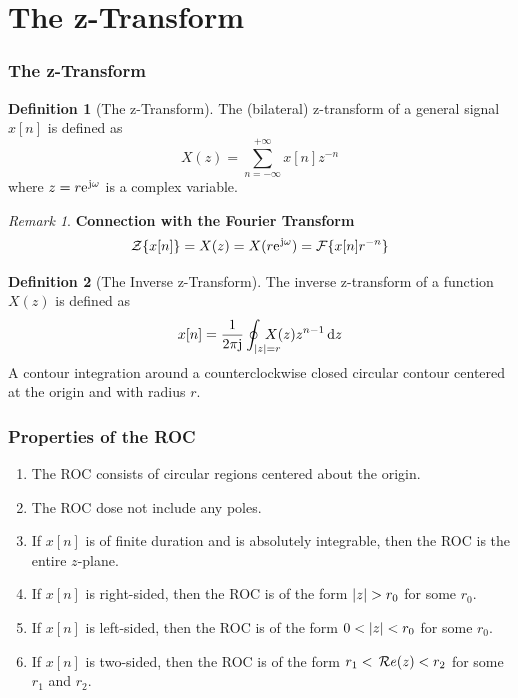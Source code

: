 \documentclass[10pt,UTF8]{article}
\newenvironment{definition box}
{\begin{tcolorbox}[colback=blue!5!white,colframe=blue!75!black,parbox=false,before upper=\par,before lower=\par]}
{\end{tcolorbox}}
\newenvironment{theorem box}
{\begin{tcolorbox}[colback=yellow!5!white,colframe=yellow!75!black,parbox=false,before upper=\par,before lower=\par]}
{\end{tcolorbox}}
\theoremstyle{definition}
\newtheorem{definition inner}{Definition}[section]
\newenvironment{definition}[1][]
{\begin{definition box}\begin{definition inner}[#1]\hfill\par}
{\end{definition inner}\end{definition box}}
\theoremstyle{plain}
\newtheorem{theorem inner}{Theorem}[section]
\theoremstyle{definition}
\newtheorem*{proof inner}{\textit{Proof}}
\theoremstyle{remark}
\newtheorem*{remark}{\textit{Remark}}
\newcommand{\ju}{\mathrm{j}}  %
\newcommand{\e}{\mathrm{e}{\mkern 1 mu}}
\renewcommand{\Re}{\,\mathcal{R}\ensuremath{e}\qty}
\begin{document}
\part*{The z-Transform}

\section{The z-Transform}

\begin{definition}[The z-Transform]
The (bilateral) z-transform of a general signal $x[n]$ is defined as
\begin{equation*}
    X(z) =
    \sum_{n=-\infty}^{+\infty} x[n] z^{-n}
\end{equation*}
where $z=r\e^{\ju\omega}$ is a complex variable.
\end{definition}

\begin{remark}
\textbf{Connection with the Fourier Transform}
\begin{equation*}
    \mathcal{Z}\{x[n]\} = X(z) =
    X(r\e^{\ju\omega}) = \mathcal{F}\{x[n] r^{-n}\}
\end{equation*}
\end{remark}

\begin{definition}[The Inverse z-Transform]
The inverse z-transform of a function $X(z)$ is defined as
\begin{equation*}
    x[n] = \frac{1}{2\pi\ju} \oint_{\abs{z}=r}\!\!\!\!\!\!\!\!
    X(z) z^{n-1} \dd{z}
\end{equation*}
A contour integration around a counterclockwise closed
circular contour centered at the origin and with radius $r$.
\end{definition}



\section{Properties of the ROC}

\begin{enumerate}
    \item The ROC consists of circular regions centered about the origin.
    \item The ROC dose not include any poles.
    \item If $x[n]$ is of finite duration and is absolutely integrable,
    then the ROC is the entire $z$-plane.
    \item If $x[n]$ is right-sided, then the ROC is of the form $\abs{z} > r_0$
    for some $r_0$.
    \item If $x[n]$ is left-sided, then the ROC is of the form $0<\abs{z}<r_0$
    for some $r_0$.
    \item If $x[n]$ is two-sided, then the ROC is of
    the form $r_1 < \Re(z) < r_2$ for some $r_1$ and $r_2$.
\end{enumerate}
\end{document}
